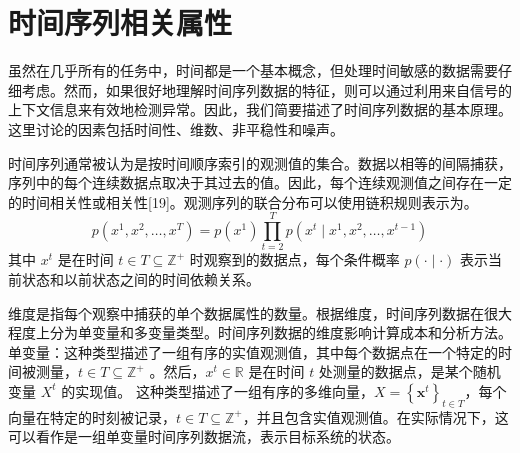 \begin{figure}[htbp]
    \centering
    \centering
    \end{figure}

\section{时间序列相关属性}
虽然在几乎所有的任务中，时间都是一个基本概念，但处理时间敏感的数据需要仔细考虑。然而，如果很好地理解时间序列数据的特征，则可以通过利用来自信号的上下文信息来有效地检测异常。因此，我们简要描述了时间序列数据的基本原理。这里讨论的因素包括时间性、维数、非平稳性和噪声。

时间序列通常被认为是按时间顺序索引的观测值的集合。数据以相等的间隔捕获，序列中的每个连续数据点取决于其过去的值。因此，每个连续观测值之间存在一定的时间相关性或相关性[19]。观测序列的联合分布可以使用链积规则表示为。
\begin{equation}
	p\left(x^1, x^2, \ldots, x^T\right)=p\left(x^1\right) \prod_{t=2}^T p\left(x^t \mid x^1, x^2, \ldots, x^{t-1}\right)
	\end{equation}
其中 $x^t$ 是在时间 $t \in T \subseteq \mathbb{Z}^{+}$ 时观察到的数据点，每个条件概率 $p(\cdot \mid \cdot)$ 表示当前状态和以前状态之间的时间依赖关系。

维度是指每个观察中捕获的单个数据属性的数量\cite{yellow1}。根据维度，时间序列数据在很大程度上分为单变量和多变量类型。时间序列数据的维度影响计算成本和分析方法。单变量：这种类型描述了一组有序的实值观测值，其中每个数据点在一个特定的时间被测量，$t \in T \subseteq \mathbb{Z}^{+}$ 。然后，$x^t \in \mathbb{R}$ 是在时间 $t$ 处测量的数据点，是某个随机变量 $X^t$ 的实现值。 这种类型描述了一组有序的多维向量，$X=\left\{\mathbf{x}^t\right\}_{t \in T}$，每个向量在特定的时刻被记录，$t \in T \subseteq \mathbb{Z}^{+}$，并且包含实值观测值。在实际情况下，这可以看作是一组单变量时间序列数据流，表示目标系统的状态。

